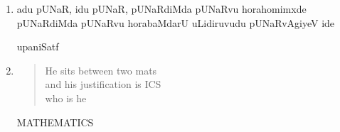 \begin{enumerate}[\rm 1)]
\item adu pUNaR, idu pUNaR, pUNaRdiMda pUNaRvu horahomimxde pUNaRdiMda pUNaRvu horabaMdarU uLidiruvudu pUNaRvAgiyeV ide
\begin{flushright}
upaniSatf
\end{flushright}

\item 
\begin{verse}
{\rm He sits between two mats}\\
{\rm and his justification is ICS}\\
{\rm who is he}
\end{verse}
\begin{flushright}
{\rm MATHEMATICS}
\end{flushright}
\end{enumerate}



